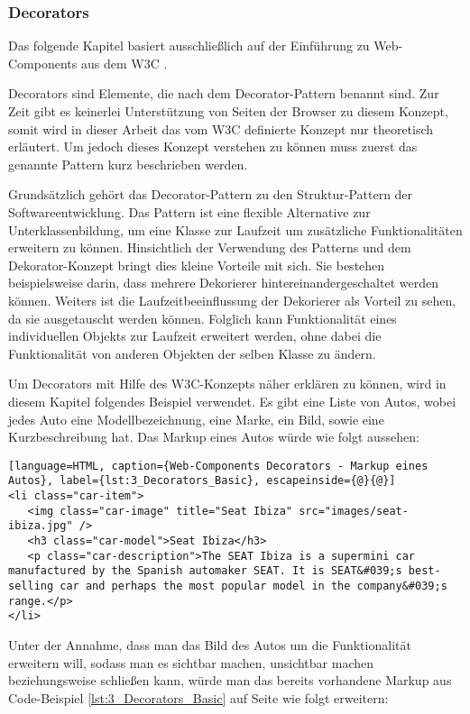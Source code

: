 \subsubsection{Decorators}
\label{sec:3_WC_Decorators}
Das folgende Kapitel basiert ausschließlich auf der Einführung zu Web-Components aus dem W3C \citereset \autocite{Glakov.2013}.

Decorators sind Elemente, die nach dem Decorator-Pattern benannt sind. Zur Zeit gibt es keinerlei Unterstützung von Seiten der Browser zu diesem Konzept, somit wird in dieser Arbeit das vom W3C definierte Konzept nur theoretisch erläutert. Um jedoch dieses Konzept verstehen zu können muss zuerst das genannte Pattern kurz beschrieben werden.

Grundsätzlich gehört das Decorator-Pattern zu den Struktur-Pattern der Softwareentwicklung. Das Pattern ist eine flexible Alternative zur Unterklassenbildung, um eine Klasse zur Laufzeit um zusätzliche Funktionalitäten erweitern zu können. Hinsichtlich der Verwendung des Patterns und dem Dekorator-Konzept bringt dies kleine Vorteile mit sich. Sie bestehen beispielsweise darin, dass mehrere Dekorierer hintereinandergeschaltet werden können. Weiters ist die Laufzeitbeeinflussung der Dekorierer als Vorteil zu sehen, da sie ausgetauscht werden können. Folglich kann Funktionalität eines individuellen Objekts zur Laufzeit erweitert werden, ohne dabei die Funktionalität von anderen Objekten der selben Klasse zu ändern.

Um Decorators mit Hilfe des W3C-Konzepts näher erklären zu können, wird in diesem Kapitel folgendes Beispiel verwendet. Es gibt eine Liste von Autos, wobei jedes Auto
eine Modellbezeichnung, eine Marke, ein Bild, sowie eine Kurzbeschreibung hat. Das Markup eines Autos würde wie folgt aussehen:

\begin{lstlisting}[language=HTML, caption={Web-Components Decorators - Markup eines Autos}, label={lst:3_Decorators_Basic}, escapeinside={@}{@}]
<li class="car-item">
   <img class="car-image" title="Seat Ibiza" src="images/seat-ibiza.jpg" />
   <h3 class="car-model">Seat Ibiza</h3>
   <p class="car-description">The SEAT Ibiza is a supermini car manufactured by the Spanish automaker SEAT. It is SEAT&#039;s best-selling car and perhaps the most popular model in the company&#039;s range.</p>
</li>
\end{lstlisting}

Unter der Annahme, dass man das Bild des Autos um die Funktionalität erweitern will, sodass man es sichtbar machen, unsichtbar machen beziehungsweise schließen kann, würde man das bereits vorhandene Markup aus Code-Beispiel \ref{lst:3_Decorators_Basic} auf Seite \pageref{lst:3_Decorators_Basic} wie folgt erweitern:

